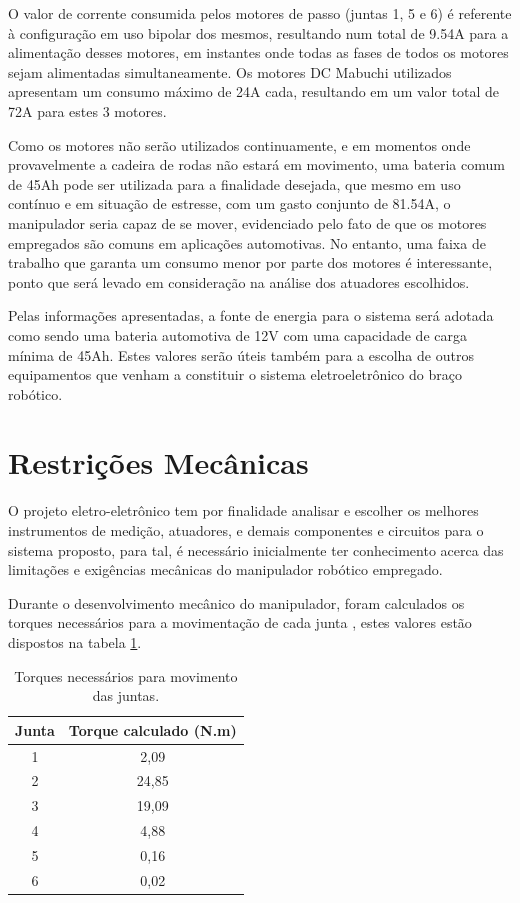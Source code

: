 O valor de corrente consumida pelos motores de passo (juntas 1, 5 e 6) é referente
à configuração em uso bipolar dos mesmos, resultando num total de 9.54A para a 
alimentação desses motores, em instantes onde todas as fases de 
todos os motores sejam alimentadas simultaneamente. 
Os motores DC Mabuchi utilizados apresentam um consumo
máximo de 24A cada, resultando em um valor total de 72A para estes 3 motores.

Como os motores não serão utilizados continuamente, e em momentos onde provavelmente 
a cadeira de rodas não estará em movimento, uma bateria comum de 45Ah pode ser
utilizada para a finalidade desejada, que mesmo em uso contínuo e em situação de 
estresse, com um gasto conjunto de 81.54A, o manipulador seria capaz de se mover, 
evidenciado pelo fato de que os motores empregados são comuns em aplicações automotivas.
No entanto, uma faixa de trabalho que garanta um consumo menor por parte dos motores é 
interessante, ponto que será levado em consideração na análise dos atuadores escolhidos. 

Pelas informações apresentadas, a fonte de energia para o sistema será adotada como sendo
uma bateria automotiva de 12V com uma capacidade de carga mínima de 45Ah. Estes valores
serão úteis também para a escolha de outros equipamentos que venham
a constituir o sistema eletroeletrônico do braço robótico.

\section{Restrições Mecânicas}

O projeto eletro-eletrônico tem por finalidade analisar e escolher os melhores 
instrumentos de medição, atuadores, e demais componentes e circuitos para o sistema 
proposto, para tal, é necessário inicialmente ter conhecimento 
acerca das limitações e exigências mecânicas do manipulador robótico empregado.

Durante o desenvolvimento mecânico do manipulador, foram calculados os 
torques necessários para a movimentação de cada junta \cite{fernando2019assistivo},
estes valores estão dispostos na tabela \ref{tab:Torques}.

\begin{table}[htb]
\begin{centering}    

\caption{Torques necessários para movimento das juntas.}

\begin{tabular}{|c|c|}
    \hline
    Junta & Torque calculado (N.m) \tabularnewline
    \hline
    \hline
    1 & 2,09 \tabularnewline
    \hline
    2 & 24,85 \tabularnewline
    \hline
    3 & 19,09 \tabularnewline
    \hline
    4 & 4,88 \tabularnewline
    \hline
    5 & 0,16 \tabularnewline
    \hline
    6 & 0,02 \tabularnewline
    \hline
\end{tabular}

\label{tab:Torques}

\par\end{centering}
\end{table}

